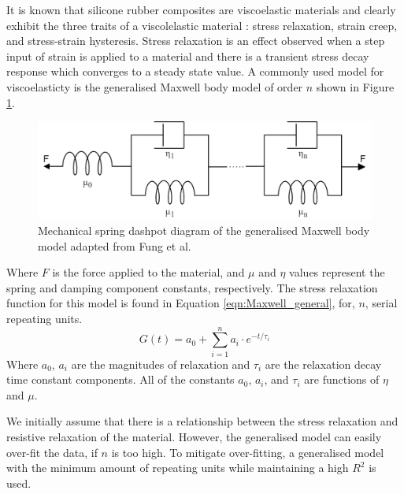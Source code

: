 It is known that silicone rubber composites are viscoelastic materials and clearly exhibit the three traits of a viscolelastic material \cite{Fung1993}: stress relaxation, strain creep, and stress-strain hysteresis. Stress relaxation is an effect observed when a step input of strain is applied to a material and there is a transient stress decay response which converges to a steady state value. A commonly used model for viscoelasticty is the generalised Maxwell body model of order $n$ shown in Figure \ref{fig:Maxwell_general}.
\begin{figure}[H]
	\centering
	\includegraphics[width=0.7\linewidth]{Figures/Generlised_Maxwell_body.png}
	\caption{Mechanical spring dashpot diagram of the generalised Maxwell body model adapted from Fung et al. \cite{Fung1993}}
	\label{fig:Maxwell_general}
\end{figure}
Where $F$ is the force applied to the material, and $\mu$ and $\eta$ values represent the spring and damping component constants, respectively. The stress relaxation function for this model is found in Equation \ref{eqn:Maxwell_general}, for, $n$, serial repeating units. 
\begin{equation}
	G(t) = a_0 + \sum^n_{i=1} a_i \cdot e^{-t/\tau_i}
	\label{eqn:Maxwell_general} 
\end{equation}
Where $a_0$, $a_i$ are the magnitudes of relaxation and $\tau_i$ are the relaxation decay time constant components. All of the constants $a_0$, $a_i$, and $\tau_i$ are functions of $\eta$ and $\mu$. 

We initially assume that there is a relationship between the stress relaxation and resistive relaxation of the material. However, the generalised model can easily over-fit the data, if $n$ is too high. To mitigate over-fitting, a generalised model with the minimum amount of repeating units while maintaining a high $R^2$ is used.

